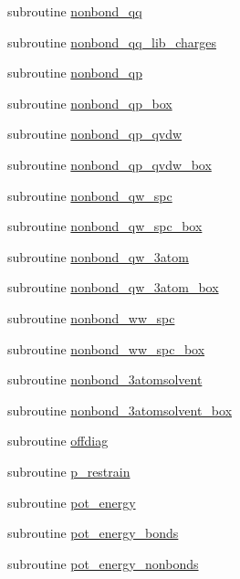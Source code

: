 \begin{DoxyCompactItemize}
\item 
subroutine \hyperlink{classmd_a5c0b03a42a559f35a8a752fb93010b01}{nonbond\-\_\-qq}
\item 
subroutine \hyperlink{classmd_a8ca76b9ab6153c78fed4b7e7313ad896}{nonbond\-\_\-qq\-\_\-lib\-\_\-charges}
\item 
subroutine \hyperlink{classmd_ac7493708397c2a8f9174c18755f98282}{nonbond\-\_\-qp}
\item 
subroutine \hyperlink{classmd_abf841b05eb9dae6e72022d6a4bb82103}{nonbond\-\_\-qp\-\_\-box}
\item 
subroutine \hyperlink{classmd_ae4ec41fd480d9f7611bc1b1d473a3f0c}{nonbond\-\_\-qp\-\_\-qvdw}
\item 
subroutine \hyperlink{classmd_a939b00ef49bf93e6d0447548535b0d9a}{nonbond\-\_\-qp\-\_\-qvdw\-\_\-box}
\item 
subroutine \hyperlink{classmd_a2e5df8a8d6f9d8c6bd6f2026735dcd2c}{nonbond\-\_\-qw\-\_\-spc}
\item 
subroutine \hyperlink{classmd_a6f2cc220c89cc9199772afb478bb6a05}{nonbond\-\_\-qw\-\_\-spc\-\_\-box}
\item 
subroutine \hyperlink{classmd_ae9ebd056ff4b9b918d6db85f3b7501b7}{nonbond\-\_\-qw\-\_\-3atom}
\item 
subroutine \hyperlink{classmd_a663e47336f036a1e2b444c4f2e8a94e5}{nonbond\-\_\-qw\-\_\-3atom\-\_\-box}
\item 
subroutine \hyperlink{classmd_ad4f5414da7b8ead8d24bd9d615ca8737}{nonbond\-\_\-ww\-\_\-spc}
\item 
subroutine \hyperlink{classmd_aacfd803d77f7653838944262e57248c3}{nonbond\-\_\-ww\-\_\-spc\-\_\-box}
\item 
subroutine \hyperlink{classmd_ab850db034cc550b0074d24d182e9c42f}{nonbond\-\_\-3atomsolvent}
\item 
subroutine \hyperlink{classmd_a7c82181eab94a77dc8352adb952d2ce9}{nonbond\-\_\-3atomsolvent\-\_\-box}
\item 
subroutine \hyperlink{classmd_ae885a42f53cb6c1c066a40f7ab024734}{offdiag}
\item 
subroutine \hyperlink{classmd_a5f47d787a2d1c1ec48fb5854d6030971}{p\-\_\-restrain}
\item 
subroutine \hyperlink{classmd_a1d2fcb4bf9fce9c03ef3cc9584c719b2}{pot\-\_\-energy}
\item 
subroutine \hyperlink{classmd_a562a2ee1724ec384edbd711aa9ef9c4a}{pot\-\_\-energy\-\_\-bonds}
\item 
subroutine \hyperlink{classmd_abbebc653c402962d37a907f58296668e}{pot\-\_\-energy\-\_\-nonbonds}

\end{DoxyCompactItemize}
